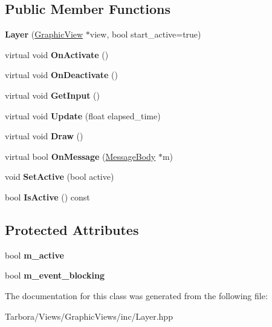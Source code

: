 \subsection*{Public Member Functions}
\begin{DoxyCompactItemize}
\item 
\mbox{\label{classTarbora_1_1Layer_a58106508db0aafaec0d5e9bbcf79e24f}} 
{\bfseries Layer} (\hyperlink{classTarbora_1_1GraphicView}{Graphic\+View} $\ast$view, bool start\+\_\+active=true)
\item 
\mbox{\label{classTarbora_1_1Layer_a7ae1fe1313d53004e2de8b2f02dd074f}} 
virtual void {\bfseries On\+Activate} ()
\item 
\mbox{\label{classTarbora_1_1Layer_a5e0a67e64b23696527b93c5b388f3f0a}} 
virtual void {\bfseries On\+Deactivate} ()
\item 
\mbox{\label{classTarbora_1_1Layer_ac37d465ecfde640ba36c76a59a028931}} 
virtual void {\bfseries Get\+Input} ()
\item 
\mbox{\label{classTarbora_1_1Layer_af0819c61bf5b4a1746dfa93f0d819e1a}} 
virtual void {\bfseries Update} (float elapsed\+\_\+time)
\item 
\mbox{\label{classTarbora_1_1Layer_a77874dc29e6cfccff041460e05d0c892}} 
virtual void {\bfseries Draw} ()
\item 
\mbox{\label{classTarbora_1_1Layer_a5cef4ea54e1dae64e612f4422485743c}} 
virtual bool {\bfseries On\+Message} (\hyperlink{classTarbora_1_1MessageBody}{Message\+Body} $\ast$m)
\item 
\mbox{\label{classTarbora_1_1Layer_a9451fd1d4d3929c11a02e5d11c425d8d}} 
void {\bfseries Set\+Active} (bool active)
\item 
\mbox{\label{classTarbora_1_1Layer_a48f220755f55d79401212d9e857a8ecb}} 
bool {\bfseries Is\+Active} () const
\end{DoxyCompactItemize}
\subsection*{Protected Attributes}
\begin{DoxyCompactItemize}
\item 
\mbox{\label{classTarbora_1_1Layer_a8b0109c4480595c468e59d6c20028791}} 
bool {\bfseries m\+\_\+active}
\item 
\mbox{\label{classTarbora_1_1Layer_ae2d36fe9cabdd70efe3b0db506ffc842}} 
bool {\bfseries m\+\_\+event\+\_\+blocking}
\end{DoxyCompactItemize}


The documentation for this class was generated from the following file\+:\begin{DoxyCompactItemize}
\item 
Tarbora/\+Views/\+Graphic\+Views/inc/Layer.\+hpp\end{DoxyCompactItemize}
